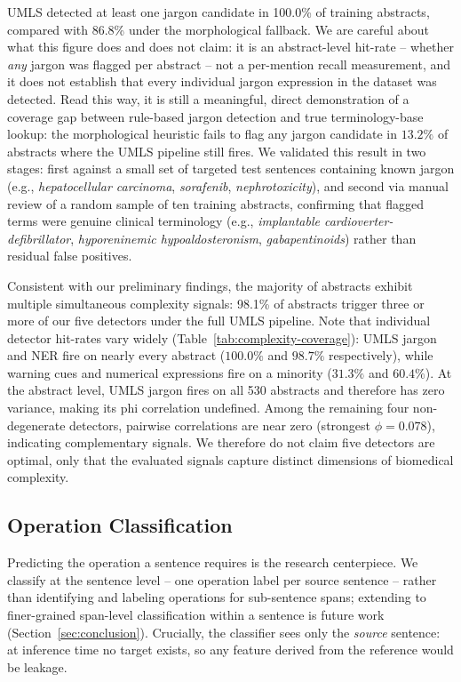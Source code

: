 \documentclass[11pt]{article}
\begin{document}
UMLS detected at least one jargon candidate in 100.0\% of training abstracts,
compared with 86.8\% under the morphological fallback. We are careful about what
this figure does and does not claim: it is an abstract-level hit-rate --
whether \emph{any} jargon was flagged per abstract -- not a per-mention recall
measurement, and it does not establish that every individual jargon expression
in the dataset was detected. Read this way, it is still a meaningful, direct
demonstration of a coverage gap between rule-based jargon detection and true
terminology-base lookup: the morphological heuristic fails to flag any
jargon candidate in $13.2\%$ of abstracts where the UMLS pipeline still
fires. We validated this result in two stages: first
against a small set of targeted test sentences containing known jargon (e.g.,
\emph{hepatocellular carcinoma}, \emph{sorafenib}, \emph{nephrotoxicity}), and
second via manual review of a random sample of ten training abstracts, confirming
that flagged terms were genuine clinical terminology (e.g., \emph{implantable
cardioverter-defibrillator}, \emph{hyporeninemic hypoaldosteronism},
\emph{gabapentinoids}) rather than residual false positives.

Consistent with our preliminary findings, the majority of abstracts exhibit
multiple simultaneous complexity signals: 98.1\% of abstracts trigger three or
more of our five detectors under the full UMLS pipeline. Note that individual
detector hit-rates vary widely (Table~\ref{tab:complexity-coverage}): UMLS
jargon and NER fire on nearly every abstract ($100.0\%$ and $98.7\%$
respectively), while warning cues and numerical expressions fire on a
minority ($31.3\%$ and $60.4\%$). At the abstract level, UMLS jargon fires on all 530 abstracts and therefore
has zero variance, making its phi correlation undefined. Among the remaining
four non-degenerate detectors, pairwise correlations are near zero (strongest
$\phi = 0.078$), indicating complementary signals. We therefore do not claim
five detectors are optimal, only that the evaluated signals capture distinct
dimensions of biomedical complexity.

\subsection{Operation Classification}
\label{sec:classifier-results}

Predicting the operation a sentence requires is the research centerpiece. We
classify at the sentence level -- one operation label per source sentence --
rather than identifying and labeling operations for sub-sentence spans; extending
to finer-grained span-level classification within a sentence is future work
(Section~\ref{sec:conclusion}). Crucially, the classifier sees only the
\emph{source} sentence: at inference time no target exists, so any feature
derived from the reference would be leakage.
\end{document}
